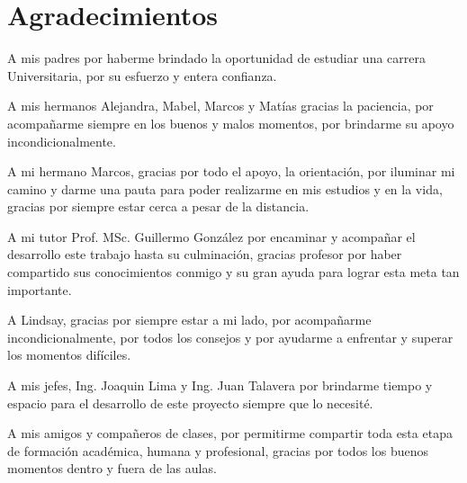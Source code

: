 \newpage

\chapter*{\centering Agradecimientos}

A mis padres por haberme brindado la oportunidad de estudiar una carrera Universitaria, por su esfuerzo y entera confianza.

A mis hermanos Alejandra, Mabel, Marcos y Matías gracias la paciencia, por acompañarme siempre en los buenos y malos momentos, por brindarme su apoyo incondicionalmente.

A mi hermano Marcos, gracias por todo el apoyo, la orientación, por iluminar mi camino y darme una pauta para poder realizarme en mis estudios y en la vida, gracias por siempre estar cerca a pesar de la distancia.

A mi tutor Prof. MSc. Guillermo González por encaminar y acompañar el desarrollo este trabajo hasta su culminación, gracias profesor por haber compartido sus conocimientos conmigo y su gran ayuda para lograr esta meta tan importante.

A Lindsay, gracias por siempre estar a mi lado, por acompañarme incondicionalmente, por todos los consejos y por ayudarme a enfrentar y superar los momentos difíciles.

A mis jefes, Ing. Joaquin Lima y Ing. Juan Talavera por brindarme tiempo y espacio para el desarrollo de este proyecto siempre que lo necesité.

A mis amigos y compañeros de clases, por permitirme compartir toda esta etapa de formación académica, humana y profesional, gracias por todos los buenos momentos dentro y fuera de las aulas.



